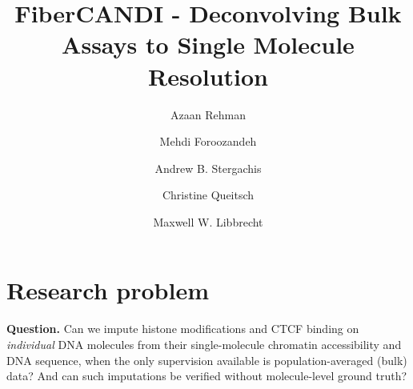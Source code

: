 \documentclass[acmtog]{acmart}
\begin{document}
\title{FiberCANDI - Deconvolving Bulk Assays to Single Molecule Resolution}

\author{Azaan Rehman}
\correspondingauthor
{}

\author{Mehdi Foroozandeh}

\author{Andrew B. Stergachis}

\author{Christine Queitsch}

\author{Maxwell W. Libbrecht}

\renewcommand{\shortauthors}{Rehman et al.}

\maketitle

\section{Research problem}

\textbf{Question.} Can we impute histone modifications and CTCF binding on \emph{individual} DNA molecules from their single-molecule chromatin accessibility and DNA sequence, when the only supervision available is population-averaged (bulk) data? And can such imputations be verified without molecule-level ground truth?
\end{document}
